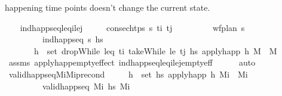 \begin{isabellebody}
\begin{isamarkuptext}
  happening time points doesn't change the current state.%
\end{isamarkuptext}\isamarkuptrue%
\ \ \isamarkupfalse%
\ ind{\isacharunderscore}{\kern0pt}happ{\isacharunderscore}{\kern0pt}seq{\isacharunderscore}{\kern0pt}leq\isactrlsub i{\isacharunderscore}{\kern0pt}le\isactrlsub j{\isacharcolon}{\kern0pt}\isanewline
\ \ \ \ \ {\isachardoublequoteopen}consec{\isacharunderscore}{\kern0pt}htps\ {\isasympi}s\ t\isactrlsub i\ t\isactrlsub j{\isachardoublequoteclose}\isanewline
\ \ \ \ \ \ \ \ \ {\isachardoublequoteopen}wf{\isacharunderscore}{\kern0pt}plan\ {\isasympi}s{\isachardoublequoteclose}\isanewline
\ \ \ \ \ \ \ \ \ {\isachardoublequoteopen}ind{\isacharunderscore}{\kern0pt}happ{\isacharunderscore}{\kern0pt}seq\ {\isasympi}s\ hs{\isachardoublequoteclose}\isanewline
\ \ \ \ \ \ \ {\isachardoublequoteopen}{\isasymforall}h\ {\isasymin}\ set\ {\isacharparenleft}{\kern0pt}dropWhile\ {\isacharparenleft}{\kern0pt}leq\ t\isactrlsub i{\isacharparenright}{\kern0pt}\ {\isacharparenleft}{\kern0pt}takeWhile\ {\isacharparenleft}{\kern0pt}le\ t\isactrlsub j{\isacharparenright}{\kern0pt}\ hs{\isacharparenright}{\kern0pt}{\isacharparenright}{\kern0pt}{\isachardot}{\kern0pt}\ apply{\isacharunderscore}{\kern0pt}happ\ h\ M\ {\isacharequal}{\kern0pt}\ M{\isachardoublequoteclose}\isanewline
%
\isadelimproof
\ \ \ \ %
\endisadelimproof
%
\isatagproof
{}\isamarkupfalse%
\ assms\ apply{\isacharunderscore}{\kern0pt}happ{\isacharunderscore}{\kern0pt}empty{\isacharunderscore}{\kern0pt}effect\ ind{\isacharunderscore}{\kern0pt}happ{\isacharunderscore}{\kern0pt}seq{\isacharunderscore}{\kern0pt}leq\isactrlsub i{\isacharunderscore}{\kern0pt}le\isactrlsub j{\isacharunderscore}{\kern0pt}empty{\isacharunderscore}{\kern0pt}eff\isanewline
\ \ \ \ \isamarkupfalse%
\ auto%
\endisatagproof
{\isafoldproof}%
%
\isadelimproof
\isanewline
%
\endisadelimproof
\isanewline
\ \ \isamarkupfalse%
\ valid{\isacharunderscore}{\kern0pt}happ{\isacharunderscore}{\kern0pt}seq{\isacharunderscore}{\kern0pt}M\isactrlsub i{\isacharunderscore}{\kern0pt}M\isactrlsub i{\isacharunderscore}{\kern0pt}precond{\isacharcolon}{\kern0pt}\isanewline
\ \ \ \ \ {\isachardoublequoteopen}{\isasymforall}h\ {\isasymin}\ set\ hs{\isachardot}{\kern0pt}\ apply{\isacharunderscore}{\kern0pt}happ\ h\ M\isactrlsub i\ {\isacharequal}{\kern0pt}\ M\isactrlsub i{\isachardoublequoteclose}\isanewline
\ \ \ \ \ \ \ \ \ {\isachardoublequoteopen}valid{\isacharunderscore}{\kern0pt}happ{\isacharunderscore}{\kern0pt}seq\ M\isactrlsub i\ hs\ M\isactrlsub i{\isachardoublequoteclose}\isanewline

\end{isabellebody}
